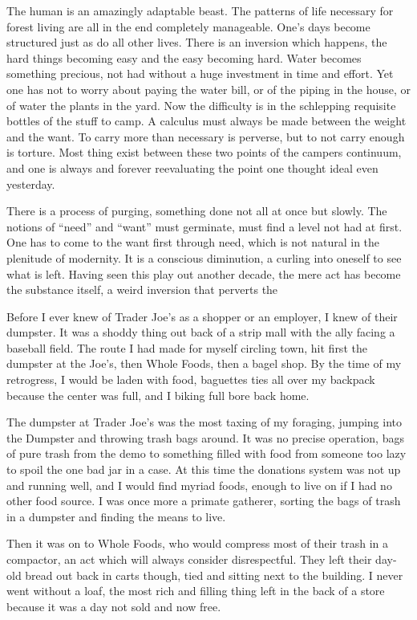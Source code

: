 \documentclass[ebook, 10pt, openright, onecolumn]{memoir}
\newcommand*\td[1]{
  \todo[inline]{
     #1 
  }
}
\newcommand*\finish{\td{ ----- Finish this section -----}}
\begin{document}
The human is an amazingly adaptable beast.  The patterns of life necessary for
forest living are all in the end completely manageable.  One's days become
structured just as do all other lives.  There is an inversion which happens, the
hard things becoming easy and the easy becoming hard.  Water becomes something
precious, not had without a huge investment in time and effort.  Yet one has not
to worry about paying the water bill, or of the piping in the house, or of water
the plants in the yard.  Now the difficulty is in the schlepping requisite
bottles of the stuff to camp.  A calculus must always be made between the weight
and the want.  To carry more than necessary is perverse, but to not carry enough
is torture.  Most thing exist between these two points of the campers continuum,
and one is always and forever reevaluating the point one thought ideal even
yesterday.

There is a process of purging, something done not all at once but slowly.  The
notions of ``need'' and ``want'' must germinate, must find a level not had at
first.  One has to come to the want first through need, which is not natural in
the plenitude of modernity.  It is a conscious diminution, a curling into
oneself to see what is left.  Having seen this play out another decade, the mere
act has become the substance itself, a weird inversion that perverts the


\finish

Before I ever knew of Trader Joe's as a shopper or an employer, I knew of their
dumpster.  It was a shoddy thing out back of a strip mall with the ally facing a
baseball field.  The route I had made for myself circling town, hit first the
dumpster at the Joe's, then Whole Foods, then a bagel shop.  By the time
of my retrogress, I would be laden with food, baguettes ties all over my
backpack because the center was full, and I biking full bore back home.

The dumpster at Trader Joe's was the most taxing of my foraging, jumping into
the Dumpster and throwing trash bags around.  It was no precise operation,
bags of pure trash from the demo to something filled with food from someone too
lazy to spoil the one bad jar in a case.  At this time the donations system was
not up and running well, and I would find myriad foods, enough to live on if I
had no other food source.  I was once more a primate gatherer, sorting the bags
of trash in a dumpster and finding the means to live.

Then it was on to Whole Foods, who would compress most of their trash in a
compactor, an act which will always consider disrespectful.  They left their
day-old bread out back in carts though, tied and sitting next to the building.
I never went without a loaf, the most rich and filling thing left in the back of
a store because it was a day not sold and now free.  
\end{document}
